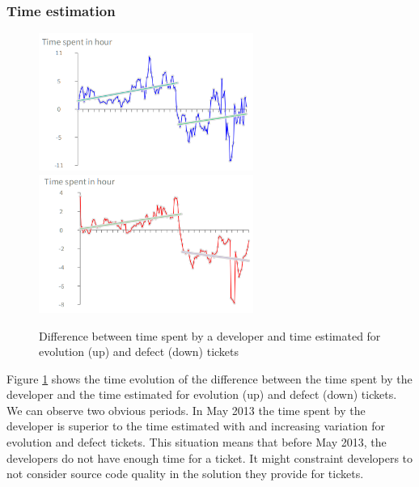 \documentclass[10pt,conference]{IEEEtran}
\begin{document}
\subsubsection{Time estimation}



\begin{figure}[htbp]
  \centering
  \includegraphics[width=70mm]{./images/estimateEvol.png}\\
  \includegraphics[width=70mm]{./images/estimateBug.png}
    \caption{Difference between time spent by a developer  and time estimated for  evolution (up) and defect (down) tickets}
  \label{fig:devEst}
\end{figure}

Figure \ref{fig:devEst} shows the time evolution of the difference between the time spent by the developer and the time estimated for evolution (up) and defect (down) tickets.
We can observe two obvious periods. 
 In May 2013 the time spent by the developer is superior to the time estimated with and increasing variation for evolution and defect tickets.
 This situation means that before May 2013, the developers do not have enough time for a ticket.
 It might constraint developers to not consider source code quality in the solution they provide for tickets.
 
\end{document}
